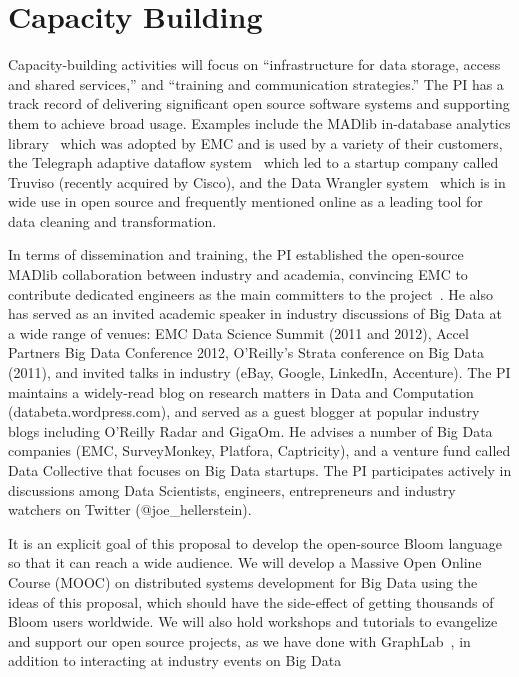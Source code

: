\section{Capacity Building}
\label{sec:capacity}
Capacity-building activities will focus on ``infrastructure for data
storage, access and shared services,'' and ``training and
communication strategies.''  The PI has a track record of
delivering significant open source software systems and
supporting them to achieve broad usage.  Examples include the MADlib in-database analytics library~\cite{madlib} which
was adopted by EMC and is used by a variety of their customers, the Telegraph adaptive dataflow system~\cite{telegraph} which led to a startup company called Truviso (recently acquired by Cisco), and the Data Wrangler system~\cite{datawrangler} which is in wide use in open source and frequently mentioned online as a leading tool for data cleaning and transformation.  

In
terms of dissemination and training, the PI established the open-source MADlib
  collaboration between industry and academia, convincing EMC to
  contribute dedicated engineers as the main committers to the project~\cite{madlib}.  He also has served as an invited academic
  speaker in industry discussions of Big Data at a wide range of venues: EMC Data Science Summit (2011
  and 2012), Accel Partners Big Data Conference 2012,
  O'Reilly's Strata conference on Big Data (2011), and invited talks in
  industry (eBay, Google, LinkedIn, Accenture).  The PI maintains a widely-read blog on
  research matters in Data and Computation (databeta.wordpress.com),
  and served as a guest blogger at popular industry blogs including
  O'Reilly Radar and GigaOm.  He advises a number of Big Data companies
  (EMC, SurveyMonkey, Platfora, Captricity), and 
  a venture fund called Data Collective that focuses on Big Data
  startups. The PI participates actively in discussions among Data
  Scientists, engineers, entrepreneurs and industry watchers on
  Twitter (@joe\_hellerstein).

It is an explicit goal of this proposal to develop the open-source
Bloom language so that it can reach a wide
audience.  We will develop a Massive Open Online Course (MOOC) on distributed systems development for Big Data using the ideas of this proposal, which should have the side-effect of getting thousands of Bloom users worldwide.  We will also hold workshops and tutorials to
evangelize and support our open source projects, as we have done with
GraphLab~\cite{uaigraphlab}, in addition to interacting at industry events on
Big Data

